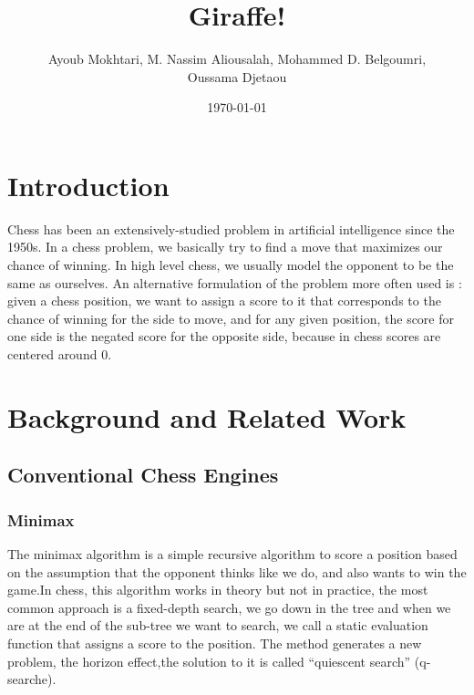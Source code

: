 \documentclass[12pt, a4paper]{report}
\author{Ayoub Mokhtari, M. Nassim Aliousalah, Mohammed D. Belgoumri,\\ Oussama Djetaou}
\date{\today}
\title{Giraffe!}
\begin{document}
	\maketitle
	\newpage
    \tableofcontents
    \newpage

	\chapter{Introduction}
		\indent Chess has been an extensively-studied problem in artificial intelligence since the 1950s. In a chess problem, we basically try to find a move that maximizes our chance of winning. In high level chess, we usually model the opponent to be the same as ourselves.
		An alternative formulation of the problem more often used is : given a chess position, we want to assign a score to it that corresponds to the chance of winning for the side to move, and for any given position, the score for one side is the negated score for the opposite side, because in chess scores are centered around 0.
		
	\chapter{Background and Related Work}
		\section{Conventional Chess Engines}
			\subsection{Minimax}
			The minimax algorithm is a simple recursive algorithm to score a position based on the assumption that the opponent thinks like we do, and also wants to win the game.In chess, this algorithm works in theory but not in practice, the most common approach is a fixed-depth search, we go down in the tree and when we are at the end of the sub-tree we want to search, we call a static evaluation function that assigns a score to the position.
			The method generates a new problem, the horizon effect,the solution to it is called “quiescent search” (q-searche).
\end{document}
